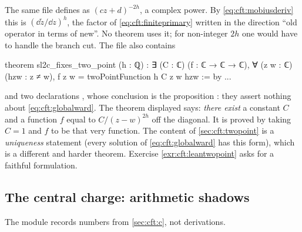 The same file defines  as $(cz+d)^{-2h}$, a complex power. By
\eqref{eq:cft:mobiusderiv} this is $(\dd\tilde z/\dd z)^{h}$, the factor of
\eqref{eq:cft:finiteprimary} written in the direction ``old operator in terms of new''. No theorem
uses it; for non-integer $2h$ one would have to handle the branch cut. The file also contains
\begin{leancode}
theorem sl2c_fixes_two_point (h : ℚ) :
    ∃ (C : ℂ) (f : ℂ → ℂ → ℂ), ∀ (z w : ℂ) (hzw : z ≠ w),
    f z w = twoPointFunction h C z w hzw := by ...
\end{leancode}
and two declarations , 
whose conclusion is the proposition : they assert nothing about
\eqref{eq:cft:globalward}. The theorem displayed says: \emph{there exist} a constant $C$ and a function $f$ equal to $C/(z-w)^{2h}$ off the
diagonal. It is proved by taking $C=1$ and $f$ to be that very function. The content of
\cref{sec:cft:twopoint} is a \emph{uniqueness} statement (every solution of
\eqref{eq:cft:globalward} has this form), which is a different and harder theorem. Exercise
\ref{exr:cft:leantwopoint} asks for a faithful formulation.

\subsection{The central charge: arithmetic shadows}

The module  records numbers from \cref{sec:cft:c}, not derivations.

